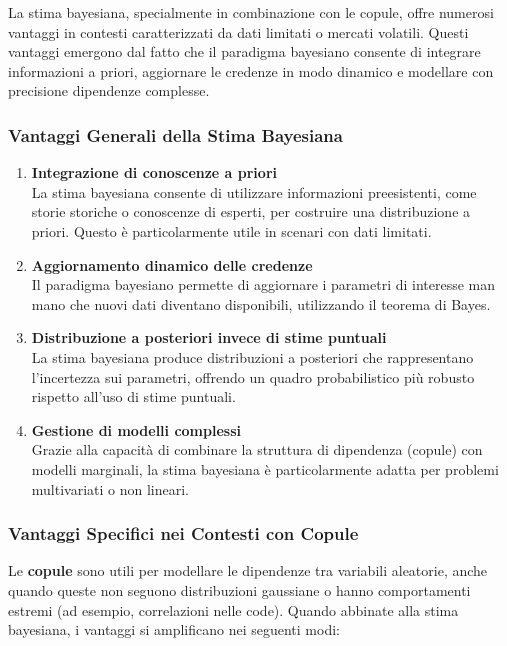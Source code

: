 \documentclass[%
	corpo=11pt,
    twoside,
    stile=classica,
    oldstyle,
    tipotesi=custom,
    greek,
    evenboxes,
]{toptesi}
\begin{document}
La stima bayesiana, specialmente in combinazione con le copule, offre numerosi vantaggi in contesti caratterizzati da dati limitati o mercati volatili. Questi vantaggi emergono dal fatto che il paradigma bayesiano consente di integrare informazioni a priori, aggiornare le credenze in modo dinamico e modellare con precisione dipendenze complesse.

\subsubsection{Vantaggi Generali della Stima Bayesiana}

\begin{enumerate}
	\item \textbf{Integrazione di conoscenze a priori} \\
	La stima bayesiana consente di utilizzare informazioni preesistenti, come storie storiche o conoscenze di esperti, per costruire una distribuzione a priori. Questo è particolarmente utile in scenari con dati limitati.
	
	\item \textbf{Aggiornamento dinamico delle credenze} \\
	Il paradigma bayesiano permette di aggiornare i parametri di interesse man mano che nuovi dati diventano disponibili, utilizzando il teorema di Bayes.
	
	\item \textbf{Distribuzione a posteriori invece di stime puntuali} \\
	La stima bayesiana produce distribuzioni a posteriori che rappresentano l’incertezza sui parametri, offrendo un quadro probabilistico più robusto rispetto all’uso di stime puntuali.
	
	\item \textbf{Gestione di modelli complessi} \\
	Grazie alla capacità di combinare la struttura di dipendenza (copule) con modelli marginali, la stima bayesiana è particolarmente adatta per problemi multivariati o non lineari.
\end{enumerate}

\subsubsection{Vantaggi Specifici nei Contesti con Copule}

Le \textbf{copule} sono utili per modellare le dipendenze tra variabili aleatorie, anche quando queste non seguono distribuzioni gaussiane o hanno comportamenti estremi (ad esempio, correlazioni nelle code). Quando abbinate alla stima bayesiana, i vantaggi si amplificano nei seguenti modi:
\end{document}
